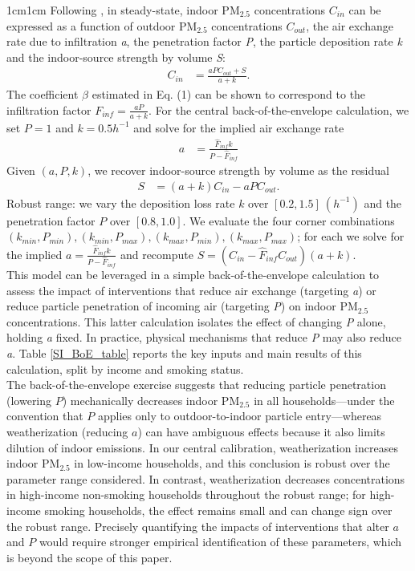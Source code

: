 \documentclass[9pt,twoside]{pnas-new}
\begin{document}
\begin{adjustwidth}{1cm}{1cm}
Following \citep{chen_review_2011}, in steady-state, indoor PM$_{2.5}$ concentrations $C_{in}$ can be expressed as a function of outdoor PM$_{2.5}$ concentrations $C_{out}$, the air exchange rate due to infiltration \textit{a}, the penetration factor \textit{P}, the particle deposition rate \textit{k} and the indoor-source strength by volume \textit{S}:
\begin{align*}
    C_{in} &= \frac{a P C_{out} +S}{a+k}.
\end{align*}
The coefficient $\beta$ estimated in Eq. (1)  can be shown to correspond to the infiltration factor $F_{inf} = \frac{a P}{a + k}$. For the central back-of-the-envelope calculation, we set $P = 1$ and $k = 0.5 h^{-1}$ and solve for the implied air exchange rate
\begin{align}
    a &= \frac{\hat{F}_{inf} k}{P - \hat{F}_{inf}}
\end{align}
Given $(a, P, k)$, we recover indoor-source strength by volume as the residual
\begin{align*}
    S &= (a + k) C_{in} - a P C_{out}.
\end{align*}
Robust range: we vary the deposition loss rate $k$ over $[0.2, 1.5]~(h^{-1})$ and the penetration factor $P$ over $[0.8, 1.0]$. We evaluate the four corner combinations $(k_{min}, P_{min}), (k_{min}, P_{max}), (k_{max}, P_{min}), (k_{max}, P_{max})$; for each we solve for the implied $a=\frac{\hat F_{inf}k}{P-\hat F_{inf}}$ and recompute $S=(C_{in}-\hat F_{inf}C_{out})(a+k)$.
\\

This model can be leveraged in a simple back-of-the-envelope calculation to assess the impact of interventions that reduce air exchange (targeting \textit{a}) or reduce particle penetration of incoming air (targeting \textit{P}) on indoor PM$_{2.5}$ concentrations. This latter calculation isolates the effect of changing \textit{P} alone, holding \textit{a} fixed. In practice, physical mechanisms that reduce \textit{P} may also reduce \textit{a}.
Table \ref{SI_BoE_table} reports the key inputs and main results of this calculation, split by income and smoking status.
\\

The back-of-the-envelope exercise suggests that reducing particle penetration (lowering $P$) mechanically decreases indoor PM$_{2.5}$ in all households—under the convention that $P$ applies only to outdoor-to-indoor particle entry—whereas weatherization (reducing $a$) can have ambiguous effects because it also limits dilution of indoor emissions. In our central calibration, weatherization increases indoor PM$_{2.5}$ in low-income households, and this conclusion is robust over the parameter range considered. In contrast, weatherization decreases concentrations in high-income non-smoking households throughout the robust range; for high-income smoking households, the effect remains small and can change sign over the robust range. Precisely quantifying the impacts of interventions that alter $a$ and $P$ would require stronger empirical identification of these parameters, which is beyond the scope of this paper.




\end{adjustwidth}
\end{document}
